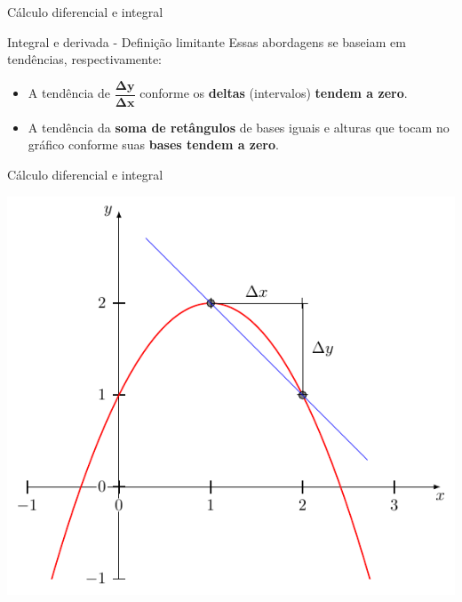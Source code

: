 \begin{frame}{Cálculo diferencial e integral}
	\begin{block}{Integral e derivada - Definição limitante}
		Essas abordagens se baseiam em tendências, respectivamente:
		\begin{itemize}
			\item A tendência de $ \bm{\dfrac{\Delta y}{\Delta x}} $ conforme os \textbf{deltas} (intervalos) \textbf{tendem a zero}.
			\item A tendência da \textbf{soma de retângulos} de bases iguais e alturas que tocam no gráfico conforme suas \textbf{bases tendem a zero}.
		\end{itemize}
	\end{block}
\end{frame}


\begin{frame}{Cálculo diferencial e integral}
	\begin{minipage}{0.49\linewidth}
		\centering
		\includegraphics[width=1\linewidth]{Figuras/Ch13/der1}
	\end{minipage}
	\hfill
	\begin{minipage}{0.49\linewidth}
		\centering

\end{minipage}
\end{frame}
